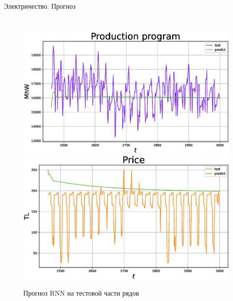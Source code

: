 \begin{frame}{Электричество. Прогноз}
\begin{columns}
\begin{figure}[h]
				\includegraphics[width=\textwidth, keepaspectratio]{img/electricity/rnn/prediction/Production_program.eps} 
				\includegraphics[width=\textwidth, keepaspectratio]{img/electricity/rnn/prediction/Price.eps}    
				\caption{Прогноз RNN на тестовой части рядов}
				
			\end{figure}
			
		\end{columns}
		
	\end{frame}
	
